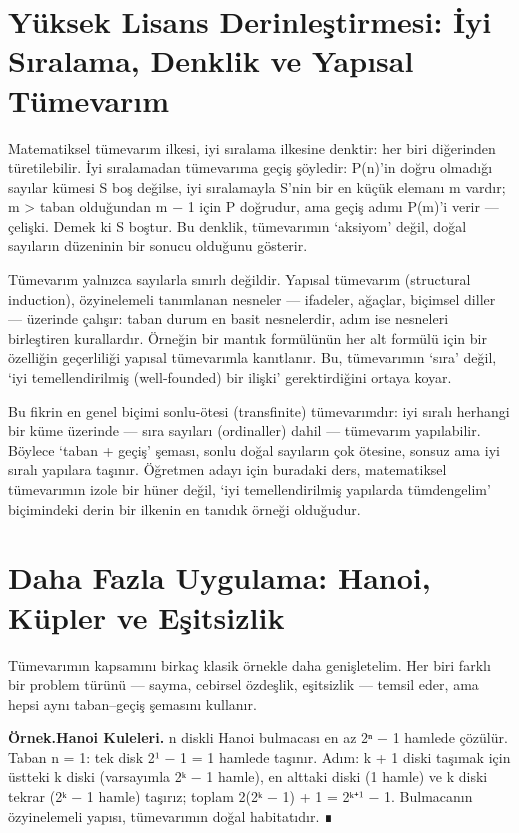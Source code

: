 \section{Yüksek Lisans Derinleştirmesi: İyi Sıralama, Denklik ve Yapısal Tümevarım}

Matematiksel tümevarım ilkesi, iyi sıralama ilkesine denktir: her biri diğerinden türetilebilir. İyi sıralamadan tümevarıma geçiş şöyledir: P(n)’in doğru olmadığı sayılar kümesi S boş değilse, iyi sıralamayla S’nin bir en küçük elemanı m vardır; m > taban olduğundan m − 1 için P doğrudur, ama geçiş adımı P(m)’i verir — çelişki. Demek ki S boştur. Bu denklik, tümevarımın ‘aksiyom’ değil, doğal sayıların düzeninin bir sonucu olduğunu gösterir.

Tümevarım yalnızca sayılarla sınırlı değildir. Yapısal tümevarım (structural induction), özyinelemeli tanımlanan nesneler — ifadeler, ağaçlar, biçimsel diller — üzerinde çalışır: taban durum en basit nesnelerdir, adım ise nesneleri birleştiren kurallardır. Örneğin bir mantık formülünün her alt formülü için bir özelliğin geçerliliği yapısal tümevarımla kanıtlanır. Bu, tümevarımın ‘sıra’ değil, ‘iyi temellendirilmiş (well-founded) bir ilişki’ gerektirdiğini ortaya koyar.

Bu fikrin en genel biçimi sonlu-ötesi (transfinite) tümevarımdır: iyi sıralı herhangi bir küme üzerinde — sıra sayıları (ordinaller) dahil — tümevarım yapılabilir. Böylece ‘taban + geçiş’ şeması, sonlu doğal sayıların çok ötesine, sonsuz ama iyi sıralı yapılara taşınır. Öğretmen adayı için buradaki ders, matematiksel tümevarımın izole bir hüner değil, ‘iyi temellendirilmiş yapılarda tümdengelim’ biçimindeki derin bir ilkenin en tanıdık örneği olduğudur.

\section{Daha Fazla Uygulama: Hanoi, Küpler ve Eşitsizlik}

Tümevarımın kapsamını birkaç klasik örnekle daha genişletelim. Her biri farklı bir problem türünü — sayma, cebirsel özdeşlik, eşitsizlik — temsil eder, ama hepsi aynı taban–geçiş şemasını kullanır.

\begin{tcolorbox}[bookbox,colback=cEx]\textbf{\textsf{\textcolor{cAcc}{Örnek.}}}\quad \textbf{Hanoi Kuleleri. }n diskli Hanoi bulmacası en az 2ⁿ − 1 hamlede çözülür. Taban n = 1: tek disk 2¹ − 1 = 1 hamlede taşınır. Adım: k + 1 diski taşımak için üstteki k diski (varsayımla 2ᵏ − 1 hamle), en alttaki diski (1 hamle) ve k diski tekrar (2ᵏ − 1 hamle) taşırız; toplam 2(2ᵏ − 1) + 1 = 2ᵏ⁺¹ − 1. Bulmacanın özyinelemeli yapısı, tümevarımın doğal habitatıdır. ∎\end{tcolorbox}

